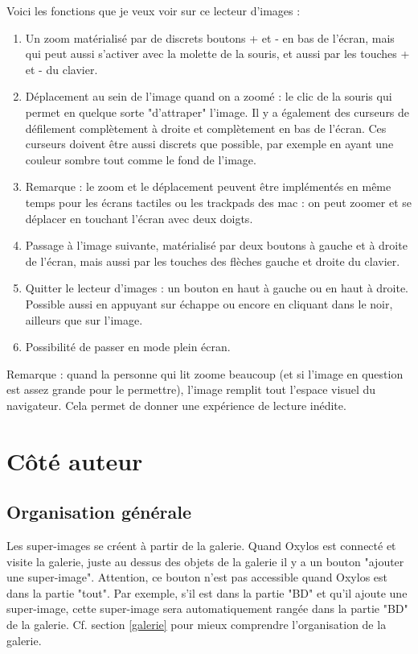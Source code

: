 \documentclass[french]{report}
\theoremstyle{plain}
\begin{document}
		Voici les fonctions que je veux voir sur ce lecteur d'images :
		\begin{enumerate}
			\item Un zoom matérialisé par de discrets boutons + et - en bas de l'écran, mais qui peut aussi s'activer avec la molette de la souris, et aussi par les touches + et - du clavier. 
			\item Déplacement au sein de l'image quand on a zoomé : le clic de la souris qui permet en quelque sorte "d'attraper" l'image. Il y a également des curseurs de défilement complètement à droite et complètement en bas de l'écran. Ces curseurs doivent être aussi discrets que possible, par exemple en ayant une couleur sombre tout comme le fond de l'image.
			\item Remarque : le zoom et le déplacement peuvent être implémentés en même temps pour les écrans tactiles ou les trackpads des mac : on peut zoomer et se déplacer en touchant l'écran avec deux doigts.
			\item Passage à l'image suivante, matérialisé par deux boutons à gauche et à droite de l'écran, mais aussi par les touches des flèches gauche et droite du clavier.
			\item Quitter le lecteur d'images : un bouton en haut à gauche ou en haut à droite. Possible aussi en appuyant sur échappe ou encore en cliquant dans le noir, ailleurs que sur l'image.
			\item Possibilité de passer en mode plein écran.
		\end{enumerate}
		Remarque : quand la personne qui lit zoome beaucoup (et si l'image en question est assez grande pour le permettre), l'image remplit tout l'espace visuel du navigateur. Cela permet de donner une expérience de lecture inédite. 


	\section{Côté auteur}

		\subsection{Organisation générale}
			Les super-images se créent à partir de la galerie. Quand Oxylos est connecté et visite la galerie, juste au dessus des objets de la galerie il y a un bouton "ajouter une super-image". Attention, ce bouton n'est pas accessible quand Oxylos est dans la partie "tout". Par exemple, s'il est dans la partie "BD" et qu'il ajoute une super-image, cette super-image sera automatiquement rangée dans la partie "BD" de la galerie. Cf. section \ref{galerie} pour mieux comprendre l'organisation de la galerie.
\end{document}
